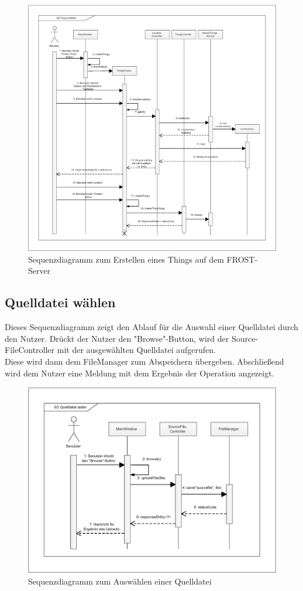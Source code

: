 \vspace{\fill}

\begin{figure}[htbp]
\centering
\includegraphics[scale=0.52]{uml/SD_createThing.eps}
\caption{Sequenzdiagramm zum Erstellen eines Things auf dem FROST-Server}
\end{figure}

\vspace{\fill}
\clearpage
\subsection{Quelldatei wählen}
Dieses Sequenzdiagramm zeigt den Ablauf für die Auswahl einer Quelldatei durch den Nutzer.
Drückt der Nutzer den "{Browse}"{-Button}, wird der Source-FileController mit der ausgewählten Quelldatei aufgerufen.\\
Diese wird dann dem FileManager zum Abspeichern übergeben.
Abschließend wird dem Nutzer eine Meldung mit dem Ergebnis der Operation angezeigt.

\vspace{\fill}
\begin{figure}[htbp]
\centering
\includegraphics[scale=0.7]{uml/SD_sourceFile.eps}
\caption{Sequenzdiagramm zum Auswählen einer Quelldatei}
\end{figure}

\vspace{\fill}